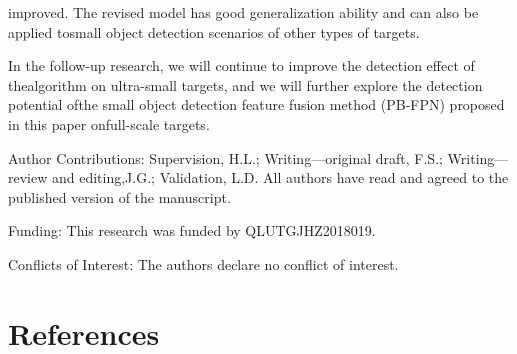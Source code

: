 \documentclass[
  10
]{article}
\begin{document}
improved. The revised model has good generalization ability and can also
be applied tosmall object detection scenarios of other types of targets.

In the follow-up research, we will continue to improve the detection
effect of thealgorithm on ultra-small targets, and we will further
explore the detection potential ofthe small object detection feature
fusion method (PB-FPN) proposed in this paper onfull-scale targets.

Author Contributions: Supervision, H.L.; Writing---original draft, F.S.;
Writing---review and editing,J.G.; Validation, L.D. All authors have
read and agreed to the published version of the manuscript.

Funding: This research was funded by QLUTGJHZ2018019.

Conflicts of Interest: The authors declare no conflict of interest.

\section{References}\label{references}
\end{document}
